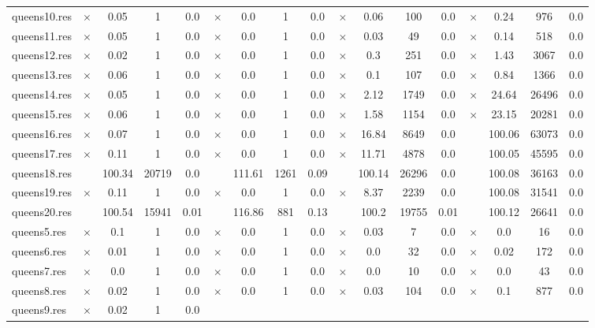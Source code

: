 \documentclass[main.tex]{subfiles}
\begin{document}
\begin{landscape}
\begin{center}
\begin{tabular}{lcccccccccccccccc}
queens10.res & $\times$ & 0.05 & 1 & 0.0
 & $\times$ & 0.0 & 1 & 0.0
 & $\times$ & 0.06 & 100 & 0.0
 & $\times$ & 0.24 & 976 & 0.0
\\
queens11.res & $\times$ & 0.05 & 1 & 0.0
 & $\times$ & 0.0 & 1 & 0.0
 & $\times$ & 0.03 & 49 & 0.0
 & $\times$ & 0.14 & 518 & 0.0
\\
queens12.res & $\times$ & 0.02 & 1 & 0.0
 & $\times$ & 0.0 & 1 & 0.0
 & $\times$ & 0.3 & 251 & 0.0
 & $\times$ & 1.43 & 3067 & 0.0
\\
queens13.res & $\times$ & 0.06 & 1 & 0.0
 & $\times$ & 0.0 & 1 & 0.0
 & $\times$ & 0.1 & 107 & 0.0
 & $\times$ & 0.84 & 1366 & 0.0
\\
queens14.res & $\times$ & 0.05 & 1 & 0.0
 & $\times$ & 0.0 & 1 & 0.0
 & $\times$ & 2.12 & 1749 & 0.0
 & $\times$ & 24.64 & 26496 & 0.0
\\
queens15.res & $\times$ & 0.06 & 1 & 0.0
 & $\times$ & 0.0 & 1 & 0.0
 & $\times$ & 1.58 & 1154 & 0.0
 & $\times$ & 23.15 & 20281 & 0.0
\\
queens16.res & $\times$ & 0.07 & 1 & 0.0
 & $\times$ & 0.0 & 1 & 0.0
 & $\times$ & 16.84 & 8649 & 0.0
 &  & 100.06 & 63073 & 0.0
\\
queens17.res & $\times$ & 0.11 & 1 & 0.0
 & $\times$ & 0.0 & 1 & 0.0
 & $\times$ & 11.71 & 4878 & 0.0
 &  & 100.05 & 45595 & 0.0
\\
queens18.res &  & 100.34 & 20719 & 0.0
 &  & 111.61 & 1261 & 0.09
 &  & 100.14 & 26296 & 0.0
 &  & 100.08 & 36163 & 0.0
\\
queens19.res & $\times$ & 0.11 & 1 & 0.0
 & $\times$ & 0.0 & 1 & 0.0
 & $\times$ & 8.37 & 2239 & 0.0
 &  & 100.08 & 31541 & 0.0
\\
queens20.res &  & 100.54 & 15941 & 0.01
 &  & 116.86 & 881 & 0.13
 &  & 100.2 & 19755 & 0.01
 &  & 100.12 & 26641 & 0.0
\\
queens5.res & $\times$ & 0.1 & 1 & 0.0
 & $\times$ & 0.0 & 1 & 0.0
 & $\times$ & 0.03 & 7 & 0.0
 & $\times$ & 0.0 & 16 & 0.0
\\
queens6.res & $\times$ & 0.01 & 1 & 0.0
 & $\times$ & 0.0 & 1 & 0.0
 & $\times$ & 0.0 & 32 & 0.0
 & $\times$ & 0.02 & 172 & 0.0
\\
queens7.res & $\times$ & 0.0 & 1 & 0.0
 & $\times$ & 0.0 & 1 & 0.0
 & $\times$ & 0.0 & 10 & 0.0
 & $\times$ & 0.0 & 43 & 0.0
\\
queens8.res & $\times$ & 0.02 & 1 & 0.0
 & $\times$ & 0.0 & 1 & 0.0
 & $\times$ & 0.03 & 104 & 0.0
 & $\times$ & 0.1 & 877 & 0.0
\\
queens9.res & $\times$ & 0.02 & 1 & 0.0

\end{tabular}
\end{center}
\end{landscape}
\end{document}
